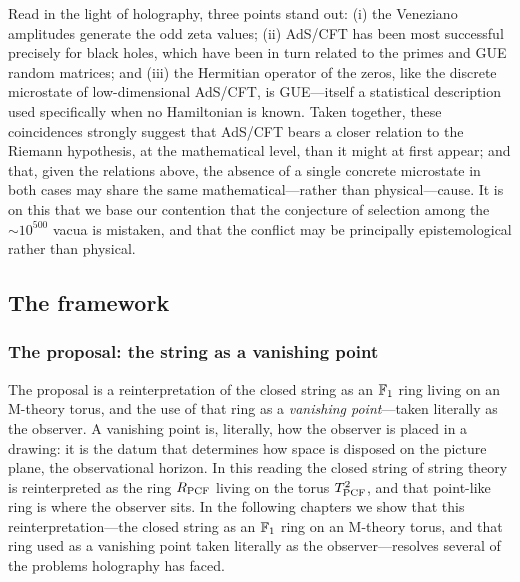 Read in the light of holography, three points stand out: (i) the Veneziano amplitudes generate the odd zeta values; (ii) AdS/CFT has been most successful precisely for black holes, which have been in turn related to the primes and GUE random matrices; and (iii) the Hermitian operator of the zeros, like the discrete microstate of low-dimensional AdS/CFT, is GUE---itself a statistical description used specifically when no Hamiltonian is known. Taken together,
these coincidences strongly suggest that AdS/CFT bears a closer relation to the Riemann hypothesis, at the
mathematical level, than it might at first appear; and that, given the relations above, the absence of a single
concrete microstate in both cases may share the same mathematical---rather than physical---cause. It is on this
that we base our contention that the conjecture of selection among the $\sim 10^{500}$ vacua is mistaken, and that
the conflict may be principally epistemological rather than physical.

\subsection{The framework}\label{sec:framework}

\subsubsection{The proposal: the string as a vanishing point}
The proposal is a reinterpretation of the closed string as an $\mathbb{F}_1$ ring living on an
M-theory torus, and the use of that ring as a \emph{vanishing point}---taken literally as the
observer. A vanishing point is, literally, how the observer is placed in a drawing: it is the
datum that determines how space is disposed on the picture plane, the observational horizon.
In this reading the closed string of string theory is reinterpreted as the ring $R_{\mathrm{PCF}}$
living on the torus $T^2_{\mathrm{PCF}}$, and that point-like ring is where the observer sits. In the following
chapters we show that this reinterpretation---the closed string as an $\mathbb{F}_1$ ring on an
M-theory torus, and that ring used as a vanishing point taken literally as the
observer---resolves several of the problems holography has faced.

